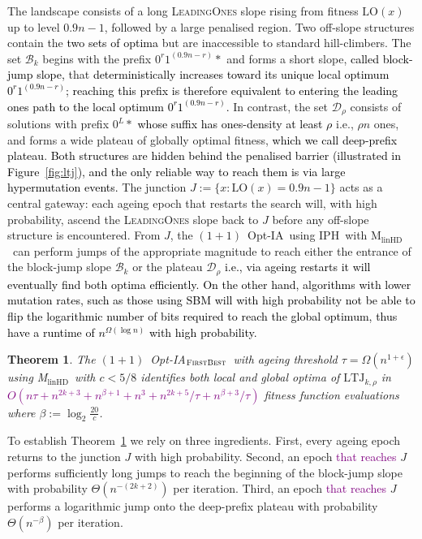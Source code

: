 \documentclass[lettersize,journal]{IEEEtran}
\newcommand{\new}[1]{\textcolor{black}{#1}}
\newcommand{\rev}[1]{\textcolor{black}{#1}}
\newcommand{\rerev}[1]{\textcolor{purple}{#1}}
\newcommand{\oneoneOPTIA}{$(1+1)$~Opt-IA}
\newcommand{\linHD}{M$_{\text{linHD}}$}
\newcommand{\IPHfcm}{IPH}
\newtheorem{theorem}{Theorem}
\begin{document}
The landscape consists of a long \textsc{LeadingOnes} slope rising from fitness 
$\mathrm{LO}(x)$ up to level $0.9n-1$, followed by a large penalised region.  
Two off-slope structures contain the \textcolor{black}{two sets of optima} but are inaccessible to 
standard hill-climbers.  
The set $\mathcal{B}_k$ begins with the prefix $0^{r}1^{(0.9n-r)} *$ and forms a 
short slope, \new{called block-jump slope,} that \textcolor{black}{deterministically increases toward its unique local optimum 
\textcolor{black}{$0^{r}1^{(0.9n-r)}$}; reaching 
this prefix is therefore equivalent to entering the leading ones path to the local optimum \textcolor{black}{
$0^{r}1^{(0.9n-r)}$}.}  
In contrast, the set $\mathcal{D}_\rho$ consists of solutions with prefix 
$0^{L} *$ \textcolor{black}{whose suffix has ones-density at least $\rho$} i.e., $\rho n$ ones, and forms a wide 
plateau of globally optimal fitness, \new{which we call  deep-prefix plateau}.  
\textcolor{black}{Both structures are hidden behind the penalised barrier (illustrated in
Figure~\ref{fig:ltj}), and the only reliable way to reach them is via large
hypermutation events.}  
The junction $J := \{x : \mathrm{LO}(x)=0.9n-1\}$ acts as a central gateway: 
each ageing epoch that restarts the search will, with high probability, ascend 
the \textsc{LeadingOnes} slope back to $J$ before any off-slope structure is encountered.  
From $J$, the \oneoneOPTIA~using \IPHfcm{}~with \linHD~can perform jumps of the 
appropriate magnitude to reach either the entrance of the block-jump slope $\mathcal{B}_k$ or 
the plateau $\mathcal{D}_\rho$ \rev{i.e., via ageing restarts it will eventually find both optima efficiently.} 
\textcolor{black}{On the other hand, algorithms with lower mutation rates, such as those using SBM will with high probability not be able to flip the logarithmic number of bits required to reach the global optimum, thus have a runtime of $n^{\Omega(\log n)}$ with high probability.}

\begin{theorem} \label{thm:main-tau-final}
The  $(1+1)$~Opt-IA$_{\textsc{FirstBest}}$~with ageing threshold $\tau=\Omega(n^{1+\epsilon})$ using  \linHD~with $c<5/8$  identifies both local and global optima of  $\mathrm{LTJ}_{k,\rho}$ in
	\rerev{$O(n\tau + n^{2k+3} + n^{\beta+1} + n^3 + n^{2k+5}/\tau + n^{\beta+3}/\tau)$} fitness function evaluations	where $\beta := \log_2 \frac{20}{c}$.
\end{theorem}

To establish Theorem~\ref{thm:main-tau-final} we rely on three ingredients.
First, every ageing epoch returns to the junction $J$ with high probability.
Second, an epoch \rerev{that reaches} $J$ performs sufficiently long jumps to reach the beginning of the block-jump slope with probability $\Theta(n^{-(2k+2)})$ per iteration.
Third, an epoch \rerev{that reaches} $J$ performs a logarithmic jump onto the deep-prefix plateau with probability $\Theta(n^{-\beta})$ per iteration.
\end{document}
